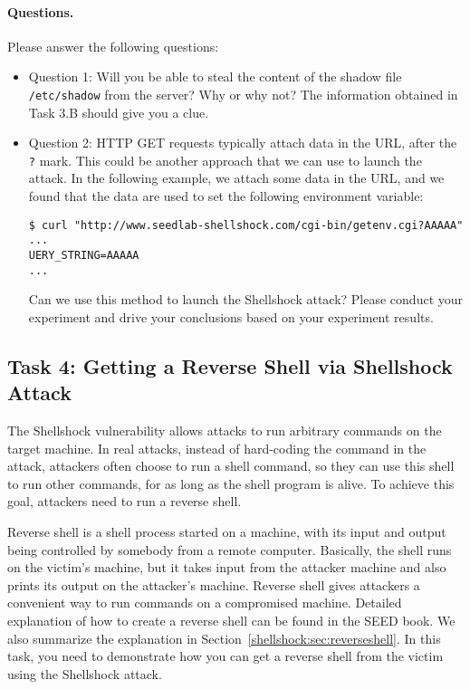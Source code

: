 \paragraph{Questions.} Please answer the following questions:
\begin{itemize}
\item Question 1: Will you be able to steal the content of 
the shadow file \texttt{/etc/shadow} from the server? Why or why not?  
The information obtained in Task 3.B should give you a clue. 

\item Question 2: HTTP GET requests typically attach data in the URL, 
after the \texttt{?} mark. This could be another 
approach that we can use to launch the attack. In the following example,
we attach some data in the URL, and we found that the data are used to set
the following environment variable: 

\begin{lstlisting}
$ curl "http://www.seedlab-shellshock.com/cgi-bin/getenv.cgi?AAAAA"
...
UERY_STRING=AAAAA
...
\end{lstlisting}

Can we use this method to launch the Shellshock attack? Please conduct your 
experiment and drive your conclusions based on your experiment results. 
     
\end{itemize}

  


\subsection{Task 4: Getting a Reverse Shell via Shellshock Attack}

The Shellshock vulnerability allows attacks to run arbitrary commands on
the target machine. In real attacks, instead of hard-coding the command 
in the attack, attackers often choose to run a shell
command, so they can use this shell to run other commands,
for as long as the shell program is alive. 
To achieve this goal, attackers need to run a reverse shell.

Reverse shell is a shell process started on a machine, with its input and output being
controlled by somebody from a remote computer. Basically, the shell runs
on the victim's machine, but it takes input from the attacker machine and
also prints its output on the attacker's machine. Reverse shell
gives attackers a convenient way to run commands on a compromised machine. 
Detailed explanation of how to create a reverse shell can be found in 
the SEED book. We also summarize the explanation in
Section~\ref{shellshock:sec:reverseshell}.
In this task, you need to demonstrate 
how you can get a reverse shell from the victim using the Shellshock attack. 


